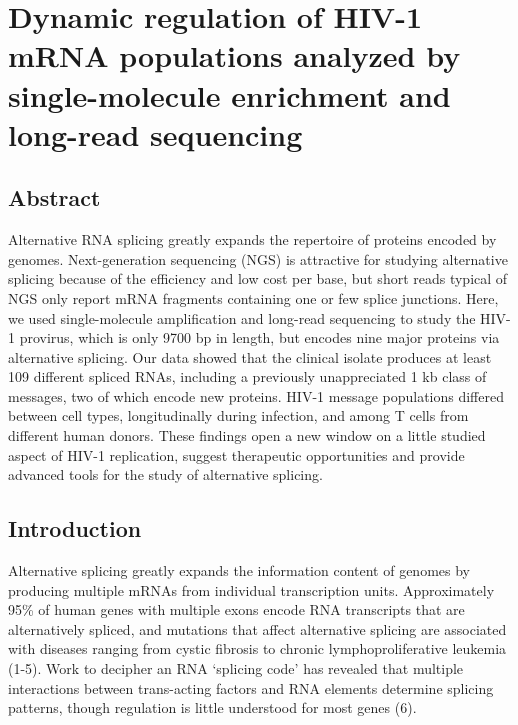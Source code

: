 \documentclass[../sherrill-Mix_thesis.tex]{subfiles}
\begin{document}
\graphicspath{{im/}{pacBio/im/}}

\chapter{Dynamic regulation of HIV-1 mRNA populations analyzed by single-molecule enrichment and long-read sequencing}

\section{Abstract}
Alternative RNA splicing greatly expands the repertoire of proteins encoded by genomes. Next-generation sequencing (NGS) is attractive for studying alternative splicing because of the efficiency and low cost per base, but short reads typical of NGS only report mRNA fragments containing one or few splice junctions. Here, we used single-molecule amplification and long-read sequencing to study the HIV-1 provirus, which is only 9700 bp in length, but encodes nine major proteins via alternative splicing. Our data showed that the clinical isolate \hivEight{} produces at least 109 different spliced RNAs, including a previously unappreciated \approximately{}1 kb class of messages, two of which encode new proteins. HIV-1 message populations differed between cell types, longitudinally during infection, and among T cells from different human donors. These findings open a new window on a little studied aspect of HIV-1 replication, suggest therapeutic opportunities and provide advanced tools for the study of alternative splicing. 

\section{Introduction}
Alternative splicing greatly expands the information content of genomes by producing multiple mRNAs from individual transcription units. Approximately 95\% of human genes with multiple exons encode RNA transcripts that are alternatively spliced, and mutations that affect alternative splicing are associated with diseases ranging from cystic fibrosis to chronic lymphoproliferative leukemia (1-5). Work to decipher an RNA `splicing code' has revealed that multiple interactions between trans-acting factors and RNA elements determine splicing patterns, though regulation is little understood for most genes (6).
\end{document}
